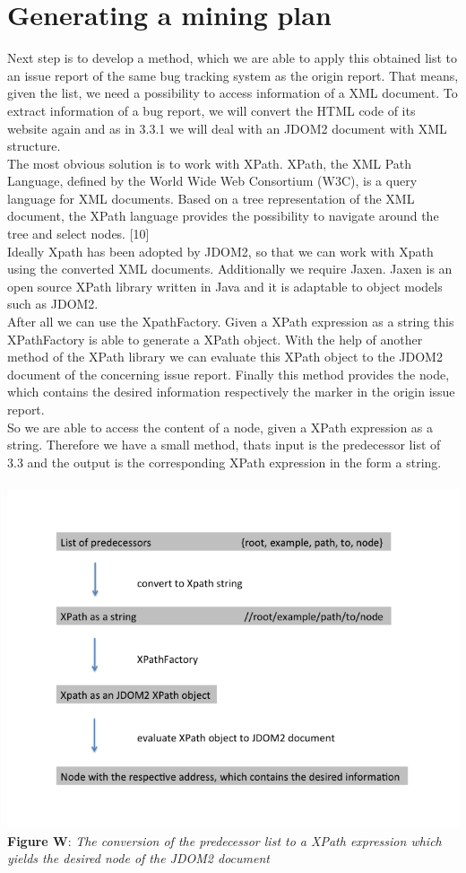 \section{Generating a mining plan}
\label{Generating a mining plan}
Next step is to develop a method, which we are able to apply this obtained list to an issue report of the same bug tracking system as the origin report. That means, given the list, we need a possibility to access information of a XML document. To extract information of a bug report, we will convert the HTML code of its website again and as in 3.3.1 we will deal with an JDOM2 document with XML structure. \\ The most obvious solution is to work with XPath. XPath, the XML Path Language, defined by the World Wide Web Consortium (W3C), is a query language for XML documents. Based on a tree representation of the XML document, the XPath language provides the possibility to navigate around the tree and select nodes. [10] \\
Ideally Xpath has been adopted by JDOM2, so that we can work with Xpath using the converted XML documents. Additionally we require Jaxen. Jaxen is an open source XPath library written in Java and it is adaptable to object models such as JDOM2. \\ After all we can use the XpathFactory. Given a XPath expression as a string this XPathFactory is able to generate a XPath object. With the help of another method of the XPath library we can evaluate this XPath object to the JDOM2 document of the concerning issue report. Finally this method provides the node, which contains the desired information respectively the marker in the origin issue report. \\ So we are able to access the content of a node, given a XPath expression as a string.
Therefore we have a small method, thats input is the predecessor list of 3.3 and the output is the corresponding XPath expression in the form a string.
\\ \\ \includegraphics[width=1.0\textwidth]{list_to_xpath.png}  \\\textbf{Figure W}: \textit{The conversion of the predecessor list to a XPath expression which yields the desired node of the JDOM2 document}  \\ \\  

